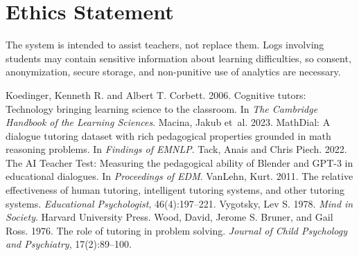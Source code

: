 \documentclass[11pt]{article}
\begin{document}
\section{Ethics Statement}
The system is intended to assist teachers, not replace them. Logs involving students may contain sensitive information about learning difficulties, so consent, anonymization, secure storage, and non-punitive use of analytics are necessary.

\begin{thebibliography}{}
 Koedinger, Kenneth R. and Albert T. Corbett. 2006. Cognitive tutors: Technology bringing learning science to the classroom. In \emph{The Cambridge Handbook of the Learning Sciences}.
 Macina, Jakub et~al. 2023. MathDial: A dialogue tutoring dataset with rich pedagogical properties grounded in math reasoning problems. In \emph{Findings of EMNLP}.
 Tack, Anais and Chris Piech. 2022. The AI Teacher Test: Measuring the pedagogical ability of Blender and GPT-3 in educational dialogues. In \emph{Proceedings of EDM}.
 VanLehn, Kurt. 2011. The relative effectiveness of human tutoring, intelligent tutoring systems, and other tutoring systems. \emph{Educational Psychologist}, 46(4):197--221.
 Vygotsky, Lev S. 1978. \emph{Mind in Society}. Harvard University Press.
 Wood, David, Jerome S. Bruner, and Gail Ross. 1976. The role of tutoring in problem solving. \emph{Journal of Child Psychology and Psychiatry}, 17(2):89--100.
\end{thebibliography}
\end{document}
